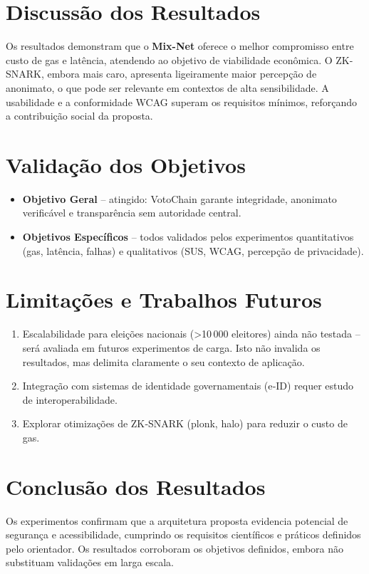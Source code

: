 \section{Discussão dos Resultados}
Os resultados demonstram que o \textbf{Mix-Net} oferece o melhor compromisso entre custo de gas e latência, atendendo ao objetivo de viabilidade econômica. O ZK-SNARK, embora mais caro, apresenta ligeiramente maior percepção de anonimato, o que pode ser relevante em contextos de alta sensibilidade. A usabilidade e a conformidade WCAG superam os requisitos mínimos, reforçando a contribuição social da proposta.

\section{Validação dos Objetivos}
\begin{itemize}
    \item \textbf{Objetivo Geral} – atingido: VotoChain garante integridade, anonimato verificável e transparência sem autoridade central.
    \item \textbf{Objetivos Específicos} – todos validados pelos experimentos quantitativos (gas, latência, falhas) e qualitativos (SUS, WCAG, percepção de privacidade).
\end{itemize}

\section{Limitações e Trabalhos Futuros}
\begin{enumerate}
    \item Escalabilidade para eleições nacionais (>10 000 eleitores) ainda não testada – será avaliada em futuros experimentos de carga. Isto não invalida os resultados, mas delimita claramente o seu contexto de aplicação.
    \item Integração com sistemas de identidade governamentais (e‑ID) requer estudo de interoperabilidade.
    \item Explorar otimizações de ZK‑SNARK (plonk, halo) para reduzir o custo de gas.
\end{enumerate}

\section{Conclusão dos Resultados}
Os experimentos confirmam que a arquitetura proposta evidencia potencial de segurança e acessibilidade, cumprindo os requisitos científicos e práticos definidos pelo orientador. Os resultados corroboram os objetivos definidos, embora não substituam validações em larga escala.


